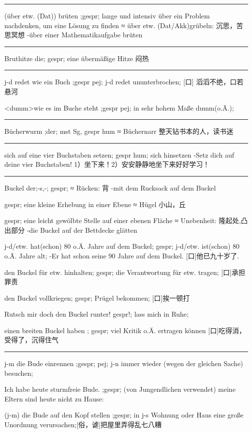 \noindent\rule{\textwidth}{1pt} 
(über etw. (Dat)) brüten ;gespr; lange und intensiv über ein Problem nachdenken, um eine Lösung zu finden ≈ über etw. (Dat/Akk)grübeln: 沉思，苦思冥想
-über einer Mathematikaufgabe brüten

\noindent\rule{\textwidth}{1pt} 
Bruthitze die; gespr; eine übermäßige Hitze 闷热

\noindent\rule{\textwidth}{1pt} 
j-d redet wie ein Buch ;gespr pej; j-d redet ununterbrochen; [口] 滔滔不绝，口若悬河

\textless dumm\textgreater  wie es im Buche steht ;gespr pej; in sehr hohem Maße dumm(o.Ä.); 

\noindent\rule{\textwidth}{1pt} 
Bücherwurm ;der; mst Sg, gespr hum ≈ Büchernarr 整天钻书本的人，读书迷

\noindent\rule{\textwidth}{1pt} 
sich auf eine vier Buchstaben setzen; gespr hum; sich hinsetzen 
-Setz dich auf deine vier Buchstaben! 1）坐下来！2）安安静静地坐下来好好学习！

\noindent\rule{\textwidth}{1pt} 
Buckel der;-s,-; gespr; ≈ Rücken: 背
-mit dem Rucksack auf dem Buckel

gespr; eine kleine Erhebung in einer Ebene ≈ Hügel 小山，丘

gespr; eine leicht gewölbte Stelle auf einer ebenen Fläche ≈ Unebenheit: 隆起处,凸出部分
-die Buckel auf der Bettdecke glätten

j-d/etw. hat(schon) 80 o.Ä. Jahre auf dem Buckel; gespr; j-d/etw. ist(schon) 80 o.Ä. Jahre alt;
-Er hat schon seine 90 Jahre auf dem Buckel. [口]他已九十岁了.

den Buckel für etw. hinhalten; gespr; die Verantwortung für etw. tragen; [口]承担罪责

den Buckel vollkriegen; gespr; Prügel bekommen; [口]挨一顿打

Rutsch mir doch den Buckel runter! gespr!; lass mich in Ruhe; 

einen breiten Buckel haben ; gespr; viel Kritik o.Ä. ertragen können [口]吃得消，受得了，沉得住气

\noindent\rule{\textwidth}{1pt} 
j-m die Bude einrennen ;gespr; pej; j-n immer wieder (wegen der gleichen Sache) besuchen;

Ich habe heute sturmfreie Bude. ;gespr; (von Jungendlichen verwendet) meine Eltern sind heute nicht zu Hause:

(j-m) die Bude auf den Kopf stellen ;gespr; in j-s Wohnung oder Haus eine große Unordnung verursachen;[俗，谑]把屋里弄得乱七八糟


